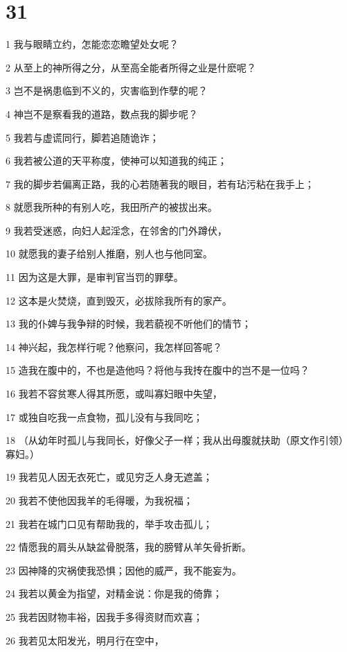 \chapter{31}

\par 1 我与眼睛立约，怎能恋恋瞻望处女呢？
\par 2 从至上的神所得之分，从至高全能者所得之业是什麽呢？
\par 3 岂不是祸患临到不义的，灾害临到作孽的呢？
\par 4 神岂不是察看我的道路，数点我的脚步呢？
\par 5 我若与虚谎同行，脚若追随诡诈；
\par 6 我若被公道的天平称度，使神可以知道我的纯正；
\par 7 我的脚步若偏离正路，我的心若随著我的眼目，若有玷污粘在我手上；
\par 8 就愿我所种的有别人吃，我田所产的被拔出来。
\par 9 我若受迷惑，向妇人起淫念，在邻舍的门外蹲伏，
\par 10 就愿我的妻子给别人推磨，别人也与他同室。
\par 11 因为这是大罪，是审判官当罚的罪孽。
\par 12 这本是火焚烧，直到毁灭，必拔除我所有的家产。
\par 13 我的仆婢与我争辩的时候，我若藐视不听他们的情节；
\par 14 神兴起，我怎样行呢？他察问，我怎样回答呢？
\par 15 造我在腹中的，不也是造他吗？将他与我抟在腹中的岂不是一位吗？
\par 16 我若不容贫寒人得其所愿，或叫寡妇眼中失望，
\par 17 或独自吃我一点食物，孤儿没有与我同吃；
\par 18 （从幼年时孤儿与我同长，好像父子一样；我从出母腹就扶助（原文作引领）寡妇。）
\par 19 我若见人因无衣死亡，或见穷乏人身无遮盖；
\par 20 我若不使他因我羊的毛得暖，为我祝福；
\par 21 我若在城门口见有帮助我的，举手攻击孤儿；
\par 22 情愿我的肩头从缺盆骨脱落，我的膀臂从羊矢骨折断。
\par 23 因神降的灾祸使我恐惧；因他的威严，我不能妄为。
\par 24 我若以黄金为指望，对精金说：你是我的倚靠；
\par 25 我若因财物丰裕，因我手多得资财而欢喜；
\par 26 我若见太阳发光，明月行在空中，
